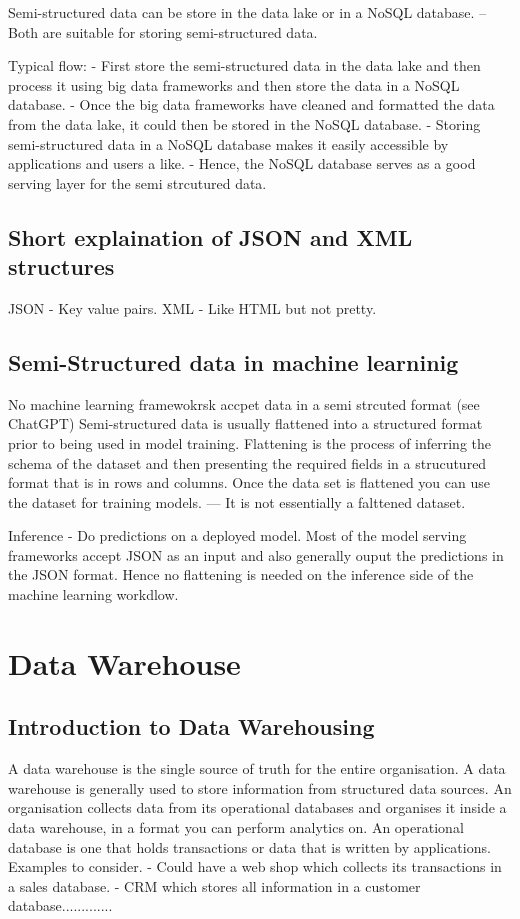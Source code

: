 \documentclass[a4paper, 11pt]{article}
\begin{document}
    Semi-structured data can be store in the data lake or in a NoSQL database.
    -- Both are suitable for storing semi-structured data.

    Typical flow:
    - First store the semi-structured data in the data lake and then process it using big data frameworks and then store the data in a NoSQL database.
    - Once the big data frameworks have cleaned and formatted the data from the data lake, it could then be stored in the NoSQL database.
    - Storing semi-structured data in a NoSQL database makes it easily accessible by applications and users a like.
    - Hence, the NoSQL database serves as a good serving layer for the semi strcutured data.

    \subsection{Short explaination of JSON and XML structures}
    JSON - Key value pairs.
    XML - Like HTML but not pretty.

    \subsection{Semi-Structured data in machine learninig}
    No machine learning framewokrsk accpet data in a semi strcuted format (see ChatGPT)
    Semi-structured data is usually flattened into a structured format prior to being used in model training.
    Flattening is the process of inferring the schema of the dataset and then presenting the required fields in a strucutured format that is in rows and columns.
    Once the data set is flattened you can use the dataset for training models.
    --- It is not essentially a falttened dataset.

    Inference
    - Do predictions on a deployed model.
    Most of the model serving frameworks accept JSON as an input and also generally ouput the predictions in the JSON format.
    Hence no flattening is needed on the inference side of the machine learning workdlow.


    \section{Data Warehouse}

    \subsection{Introduction to Data Warehousing}
    A data warehouse is the single source of truth for the entire organisation.
    A data warehouse is generally used to store information from structured data sources.
    An organisation collects data from its operational databases and organises it inside a data warehouse, in a format you can perform analytics on.
    An operational database is one that holds transactions or data that is written by applications.
    Examples to consider.
    - Could have a web shop which collects its transactions in a sales database.
    - CRM which stores all information in a customer database.............
\end{document}
